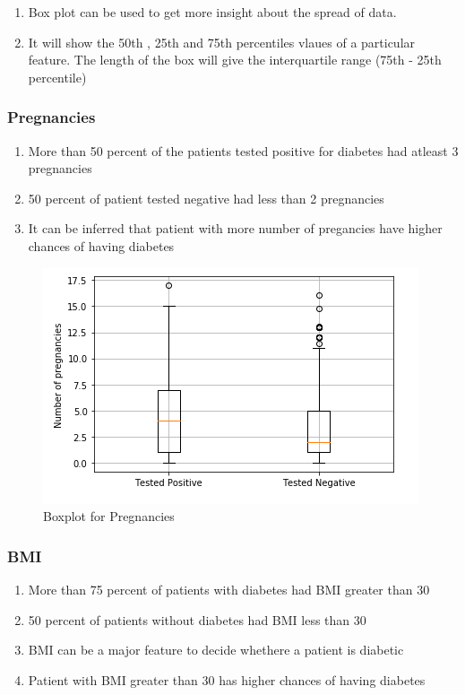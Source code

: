 \documentclass[12pt]{article}
\begin{document}
\begin{enumerate}
\item Box plot can be used to get more insight about the spread of data.
\item It will show the 50th , 25th and 75th percentiles vlaues of a particular feature. The length of the box will give the interquartile range (75th - 25th percentile) 
\end{enumerate}

\subsubsection{Pregnancies}

\begin{enumerate}
\item More than 50 percent of the patients tested positive for diabetes had atleast 3 pregnancies
\item 50 percent of patient tested negative had less than 2 pregnancies
\item It can be inferred that patient with more number of pregancies have higher chances of having diabetes
\end{enumerate}

\begin{figure}[h]
\centering
\includegraphics[scale=0.6]{boxplot_preg.PNG} 
\caption{Boxplot for Pregnancies}
\label{etiqueta}
\end{figure}

\subsubsection{BMI}

\begin{enumerate}
\item More than 75 percent of patients with diabetes had BMI greater than 30
\item 50 percent of patients without diabetes had BMI less than 30
\item BMI can be a major feature to decide whethere a patient is diabetic
\item Patient with BMI greater than 30 has higher chances of having diabetes
\end{enumerate}
\end{document}
